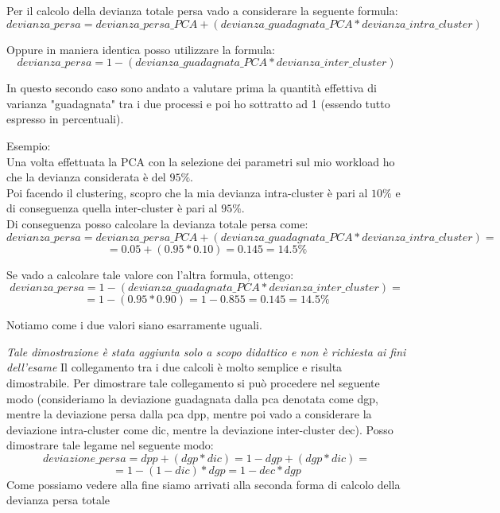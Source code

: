 Per il calcolo della devianza totale persa vado a considerare la seguente formula:
\[
devianza\_persa = devianza\_persa\_PCA + (devianza\_guadagnata\_PCA * devianza\_intra\_cluster)
\]

Oppure in maniera identica posso utilizzare la formula:
\[
devianza\_persa = 1 - (devianza\_guadagnata\_PCA * devianza\_inter\_cluster)
\]

In questo secondo caso sono andato a valutare prima la quantità effettiva di varianza "guadagnata" tra i due processi e poi ho sottratto ad 1 (essendo tutto espresso in percentuali).

Esempio:\\
Una volta effettuata la PCA con la selezione dei parametri sul mio workload ho che la devianza considerata è del \(95\%\).\\
Poi facendo il clustering, scopro che la mia devianza intra-cluster è pari al \(10\%\) e di conseguenza quella inter-cluster è pari al \(95\%\).\\
Di conseguenza posso calcolare la devianza totale persa come:
\[
devianza\_persa = devianza\_persa\_PCA + (devianza\_guadagnata\_PCA * devianza\_intra\_cluster)=
\]
\[
= 0.05 + (0.95 * 0.10) = 0.145 = 14.5\%
\]

Se vado a calcolare tale valore con l'altra formula, ottengo:
\[
devianza\_persa = 1 - (devianza\_guadagnata\_PCA * devianza\_inter\_cluster)=
\]
\[
= 1 - (0.95 * 0.90) = 1 - 0.855 = 0.145 = 14.5\%
\]

Notiamo come i due valori siano esarramente uguali.

\begin{info}
\textit{Tale dimostrazione è stata aggiunta solo a scopo didattico e non è richiesta ai fini dell'esame}
Il collegamento tra i due calcoli è molto semplice e risulta dimostrabile. Per dimostrare tale collegamento si può procedere nel seguente modo (consideriamo la deviazione guadagnata dalla pca denotata come dgp, mentre la deviazione persa dalla pca dpp, mentre poi vado a considerare la deviazione intra-cluster come dic, mentre la deviazione inter-cluster dec). Posso dimostrare tale legame nel seguente modo:
\[
deviazione\_persa = dpp + (dgp * dic) = 1 - dgp + (dgp * dic)=
\]
\[
= 1 - (1 - dic) * dgp = 1 - dec * dgp
\]
Come possiamo vedere alla fine siamo arrivati alla seconda forma di calcolo della devianza persa totale
\end{info}

